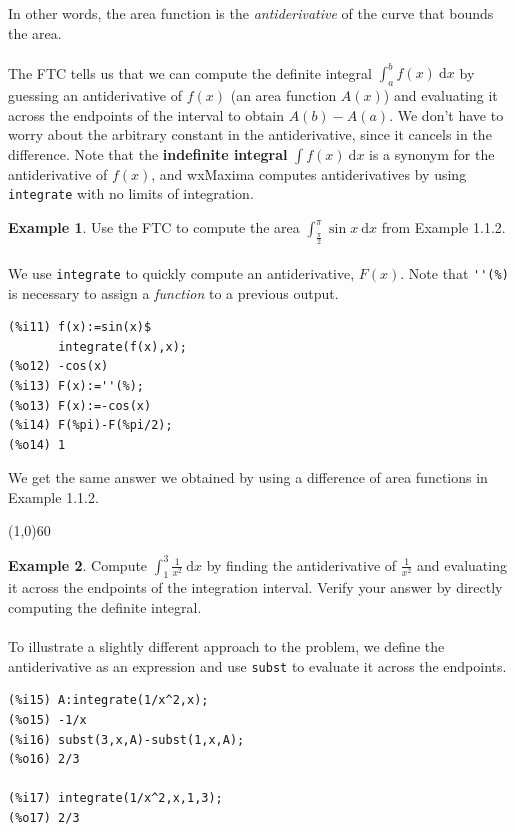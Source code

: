 \documentclass[10.5pt,twoside]{report}
\theoremstyle{definition}
\newtheorem{exmp}{Example}[section]
\begin{document}
In other words, the area function is the \textit{antiderivative} of the curve that bounds the area.\\
${}$\\
The FTC tells us that we can compute the definite integral $\displaystyle \int_a^b f(x) \ \mathrm{d}x$ by guessing an antiderivative of $f(x)$ (an area function $A(x)$) and evaluating it across the endpoints of the interval to obtain $A(b)-A(a)$.  We don't have to worry about the arbitrary constant in the antiderivative, since it cancels in the difference.  Note that the \textbf{indefinite integral} $\displaystyle \int f(x) \ \mathrm{d}x$ is a synonym for the antiderivative of $f(x)$, and wxMaxima computes antiderivatives by using \verb|integrate| with no limits of integration. \\



\begin{exmp}  Use the FTC to compute the area $\displaystyle \int_{\frac{\pi}{2}}^{\pi} \sin{x}\ \mathrm{d}x$ from Example 1.1.2.\\
${}$\\


We use \verb|integrate| to quickly compute an antiderivative, $F(x)$.  Note that \verb|''(%)| is necessary to assign a \textit{function} to a previous output. 

\begin{verbatim}
(%i11) f(x):=sin(x)$
       integrate(f(x),x);
(%o12) -cos(x)
(%i13) F(x):=''(%);
(%o13) F(x):=-cos(x)
(%i14) F(%pi)-F(%pi/2);
(%o14) 1
\end{verbatim}

We get the same answer we obtained by using a difference of area functions in Example 1.1.2.

\line(1,0){60}
\linethickness{0.5mm}

\end{exmp}



\begin{exmp}  Compute $\displaystyle \int_1^3 \frac{1}{x^2} \ \mathrm{d}x$ by finding the antiderivative of $\frac{1}{x^2}$ and evaluating it across the endpoints of the integration interval. Verify your answer by directly computing the definite integral.\\
${}$\\
To illustrate a slightly different approach to the problem, we define the antiderivative as an expression and use \verb|subst| to evaluate it across the endpoints.

\begin{verbatim}
(%i15) A:integrate(1/x^2,x);
(%o15) -1/x
(%i16) subst(3,x,A)-subst(1,x,A);
(%o16) 2/3

(%i17) integrate(1/x^2,x,1,3);
(%o17) 2/3
\end{verbatim}



\end{exmp}
\end{document}
